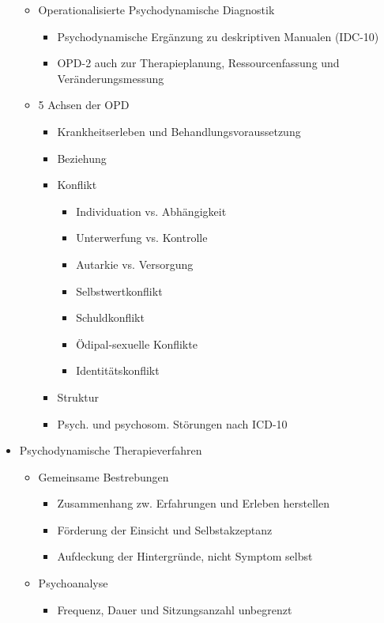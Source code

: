 \documentclass[11pt, paper=a4, twocolumn]{scrartcl}
\begin{document}
\begin{itemize}
\begin{itemize}
					\item Operationalisierte Psychodynamische Diagnostik
						\begin{itemize}
							\item Psychodynamische Ergänzung zu deskriptiven Manualen (IDC-10)
							\item OPD-2 auch zur Therapieplanung, Ressourcenfassung und Veränderungsmessung
						\end{itemize}
					\item 5 Achsen der OPD
						\begin{itemize}
							\item Krankheitserleben und Behandlungsvoraussetzung
							\item Beziehung
							\item Konflikt
								\begin{itemize}
									\item Individuation vs. Abhängigkeit
									\item Unterwerfung vs. Kontrolle
									\item Autarkie vs. Versorgung
									\item Selbstwertkonflikt
									\item Schuldkonflikt
									\item Ödipal-sexuelle Konflikte
									\item Identitätskonflikt
								\end{itemize}
							\item Struktur
							\item Psych. und psychosom. Störungen nach ICD-10
						\end{itemize}
				\end{itemize}
			\item Psychodynamische Therapieverfahren
				\begin{itemize}
					\item Gemeinsame Bestrebungen
						\begin{itemize}
							\item Zusammenhang zw. Erfahrungen und Erleben herstellen
							\item Förderung der Einsicht und Selbstakzeptanz
							\item Aufdeckung der Hintergründe, nicht Symptom selbst
						\end{itemize}
					\item Psychoanalyse
						\begin{itemize}
							\item Frequenz, Dauer und Sitzungsanzahl unbegrenzt

\end{itemize}
\end{itemize}
\end{itemize}
\end{document}
